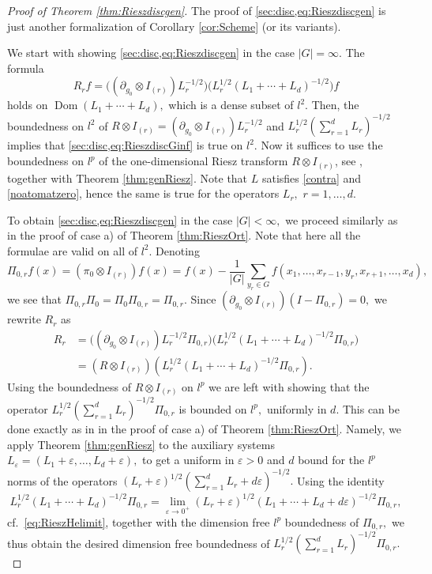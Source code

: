 \documentclass[leqno,12pt]{amsart}
\theoremstyle{definition}
\theoremstyle{remark}
\begin{document}
\begin{proof}[Proof of Theorem \ref{thm:Rieszdiscgen}]
The proof of \eqref{sec:disc,eq:Rieszdiscgen} is just another formalization of Corollary \ref{cor:Scheme} (or its variants).

We start with showing \eqref{sec:disc,eq:Rieszdiscgen} in the case $|G|=\infty.$ The formula
\begin{equation}
\label{sec:disc,eq:RieszdiscGinf}
R_r f=\big((\partial_{g_0}\otimes I_{(r)})L_r^{-1/2}\big)\big(L_r^{1/2}(L_1+\cdots+ L_d)^{-1/2}\big)f\end{equation}
holds on $\operatorname{Dom}(L_1+\cdots +L_d),$ which is a dense subset of $l^2.$ Then, the boundedness on $l^2$ of $R\otimes I_{(r)}=(\partial_{g_0}\otimes I_{(r)})L_r^{-1/2}$ and $L_r^{1/2}(\sum_{r=1}^d L_r)^{-1/2}$ implies that \eqref{sec:disc,eq:RieszdiscGinf} is true on $l^2.$ Now
it suffices to use the boundedness on $l^p$ of the one-dimensional Riesz transform $R\otimes I_{(r)}$, see \cite[Theorem 2.4]{AlexdisRiesz}, together with Theorem \ref{thm:genRiesz}. Note that $L$ satisfies \eqref{contra} and \eqref{noatomatzero}, hence the same is true for the operators $L_r,$ $r=1,\ldots,d.$

To obtain \eqref{sec:disc,eq:Rieszdiscgen} in the case $|G|<\infty,$ we proceed similarly as in the proof of case a) of Theorem \ref{thm:RieszOrt}. Note that here all the formulae are valid on all of $l^2.$ Denoting $$\Pi_{0,r}f(x)=(\pi_0\otimes I_{(r)})f(x)=f(x)-\frac{1}{|G|}\sum_{y_r\in G}f(x_1,\ldots,x_{r-1},y_r,x_{r+1},\ldots,x_d),$$ we see that $\Pi_{0,r}\Pi_0=\Pi_0\Pi_{0,r}=\Pi_{0,r}.$ Since $(\partial_{g_0}\otimes I_{(r)})(I-\Pi_{0,r})=0,$ we rewrite $R_r$ as
\begin{align*}R_r&=\big((\partial_{g_0}\otimes I_{(r)})L_r^{-1/2}\Pi_{0,r}\big)\big(L_r^{1/2}(L_1+\cdots + L_d)^{-1/2}\Pi_{0,r}\big)\\&=(R\otimes I_{(r)})(L_r^{1/2}(L_1+\cdots + L_d)^{-1/2}\Pi_{0,r}).\end{align*}
Using the boundedness of  $R\otimes I_{(r)}$ on $l^p$ we are left with showing that the operator $L_r^{1/2}(\sum_{r=1}^d L_r)^{-1/2}\Pi_{0,r}$ is bounded on $l^p,$ uniformly in $d.$ This can be done exactly as in in the proof of case a) of Theorem \ref{thm:RieszOrt}. Namely, we apply Theorem \ref{thm:genRiesz} to the auxiliary systems $L_{\varepsilon}=(L_1+\varepsilon,\ldots,L_d+\varepsilon),$ to get a uniform in $\varepsilon>0$ and $d$ bound for the $l^p$ norms of the operators $(L_r+\varepsilon)^{1/2}(\sum_{r=1}^d L_r+d\varepsilon)^{-1/2}.$ Using the identity
$$L_r^{1/2}(L_1+\cdots +L_d)^{-1/2}\Pi_{0,r}=\lim_{\varepsilon\to 0^+}(L_r+\varepsilon)^{1/2}(L_1+\cdots+L_d+d\varepsilon)^{-1/2}\Pi_{0,r},$$
cf.\ \eqref{eq:RieszHelimit},
together with the dimension free $l^p$ boundedness of $\Pi_{0,r},$ we thus obtain the desired dimension free boundedness of $L_r^{1/2}(\sum_{r=1}^d L_r)^{-1/2}\Pi_{0,r}.$


\end{proof}
\end{document}
